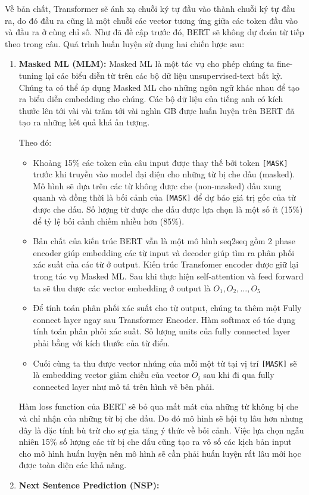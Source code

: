 Về bản chất, Transformer sẽ ánh xạ chuỗi ký tự đầu vào thành chuỗi ký tự đầu ra, do đó đầu ra cũng là một chuỗi các vector tương ứng giữa các token đầu vào và đầu ra ở cùng chỉ số. Như đã đề cập trước đó, BERT sẽ không dự đoán từ tiếp theo trong câu. Quá trình huấn luyện sử dụng hai chiến lược sau\cite{webpage20}:
\begin{enumerate}
    \item \textbf{Masked ML (MLM):}
          Masked ML là một tác vụ cho phép chúng ta fine-tuning lại các biểu diễn từ trên các bộ dữ liệu unsupervised-text bất kỳ. Chúng ta có thể áp dụng Masked ML cho những ngôn ngữ khác nhau để tạo ra biểu diễn embedding cho chúng. Các bộ dữ liệu của tiếng anh có kích thước lên tới vài vài trăm tới vài nghìn GB được huấn luyện trên BERT đã tạo ra những kết quả khá ấn tượng.

          Theo đó:
          \begin{itemize}
              \item Khoảng 15\% các token của câu input được thay thế bởi token {\tt [MASK]} trước khi truyền vào model đại diện cho những từ bị che dấu (masked). Mô hình sẽ dựa trên các từ không được che (non-masked) dấu xung quanh và đồng thời là bối cảnh của {\tt [MASK]} để dự báo giá trị gốc của từ được che dấu. Số lượng từ được che dấu được lựa chọn là một số ít (15\%) để tỷ lệ bối cảnh chiếm nhiều hơn (85\%).
              \item Bản chất của kiến trúc BERT vẫn là một mô hình seq2seq gồm 2 phase encoder giúp embedding các từ input và decoder giúp tìm ra phân phối xác suất của các từ ở output. Kiến trúc Transfomer encoder được giữ lại trong tác vụ Masked ML. Sau khi thực hiện self-attention và feed forward ta sẽ thu được các vector embedding ở output là $O_1, O_2,…, O_5$
              \item Để tính toán phân phối xác suất cho từ output, chúng ta thêm một Fully connect layer ngay sau Transformer Encoder. Hàm softmax có tác dụng tính toán phân phối xác suất. Số lượng units của fully connected layer phải bằng với kích thước của từ điển.
              \item Cuối cùng ta thu được vector nhúng của mỗi một từ tại vị trí {\tt [MASK]} sẽ là embedding vector giảm chiều của vector $O_i$ sau khi đi qua fully connected layer như mô tả trên hình vẽ bên phải.
          \end{itemize}

          Hàm loss function của BERT sẽ bỏ qua mất mát của những từ không bị che và chỉ nhận của những từ bị che dấu. Do đó mô hình sẽ hội tụ lâu hơn nhưng đây là đặc tính bù trừ cho sự gia tăng ý thức về bối cảnh. Việc lựa chọn ngẫu nhiên 15\% số lượng các từ bị che dấu cũng tạo ra vô số các kịch bản input cho mô hình huấn luyện nên mô hình sẽ cần phải huấn luyện rất lâu mới học được toàn diện các khả năng.
    \item \textbf{Next Sentence Prediction (NSP):}


\end{enumerate}
